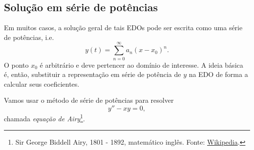\subsection{Solução em série de potências}

Em muitos casos, a solução geral de tais EDOs pode ser escrita como uma série de potências, i.e.
\begin{equation}
  y(t) = \sum_{n=0}^{\infty} a_n(x-x_0)^n.
\end{equation}
O ponto $x_0$ é arbitrário e deve pertencer ao domínio de interesse. A ideia básica é, então, substituir a representação em série de potência de $y$ na EDO de forma a calcular seus coeficientes.

\begin{ex}
  Vamos usar o método de série de potências para resolver
  \begin{equation}
    y'' - xy = 0,
  \end{equation}
  chamada \emph{equação de Airy}\footnote{Sir George Biddell Airy, 1801 - 1892, matemático inglês. Fonte: \href{https://en.wikipedia.org/wiki/George_Biddell_Airy}{Wikipedia}.}.


\end{ex}
